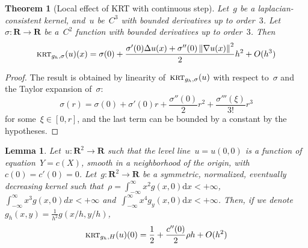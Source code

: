 \documentclass[12pt]{article}                  %
\newtheorem{theorem}{Theorem}
\newtheorem{lemma}{Lemma}
\begin{document}
\begin{theorem}[Local effect of KRT with continuous step]
	\label{thm:contistep}
	Let~$g$ be a laplacian-consistent kernel, and~$u$ be~$C^3$ with bounded
	derivatives up to order~$3$.
	Let~$\sigma:\mathbf{R}\to\mathbf{R}$ be a~$C^2$ function with bounded
	derivatives up to order~$3$.
	Then
	\[
		\textsc{krt}_{g_h,\sigma}(u)(x) = \sigma(0)
		+
		\frac{
			\sigma'(0)\Delta u(x)
			+
			\sigma''(0)\left\|\nabla u(x)\right\|^2
		}2
		h^2
		+O(h^3)
	\]
\end{theorem}
\begin{proof}
	The result is obtained by linearity of~$\textsc{krt}_{g_h,\sigma}(u)$ with
	respect to~$\sigma$ and the Taylor expansion of~$\sigma$:
	\[
		\sigma(r)=\sigma(0)+\sigma'(0)r+\frac{\sigma''(0)}2r^2+\frac{\sigma'''(\xi)}{3!}r^3
	\]
	for some~$\xi\in[0,r]$, and the last term can be bounded by a constant
	by the hypotheses.
%
%
\end{proof}





\clearpage
\begin{lemma}\label{lem:curv1}
	Let~$u:\mathbf{R}^2\to\mathbf{R}$ such that the level line~$u=u(0,0)$ is a
	function of equation~$Y=c(X)$, smooth in a neighborhood of the origin,
	with~$c(0)=c'(0)=0$.
	Let~$g:\mathbf{R}^2\to\mathbf{R}$ be a symmetric, normalized,
	eventually decreasing kernel such that~$\rho=\int_{-\infty}^\infty
	x^2g(x,0)\mathrm{d} x<+\infty$, $\int_{-\infty}^\infty x^3g(x,0)dx<+\infty$ and~$\int_{-\infty}^\infty x^4g_y(x,0)\mathrm{d}
	x<+\infty$.  Then, if we
	denote~$g_h(x,y)=\frac1{h^2}g(x/h,y/h)$,
	\[
		\textsc{krt}_{g_h,H}(u)(0)=\frac12+\frac{c''(0)}2\rho h+O(h^2)
	\]
\end{lemma}
\end{document}
